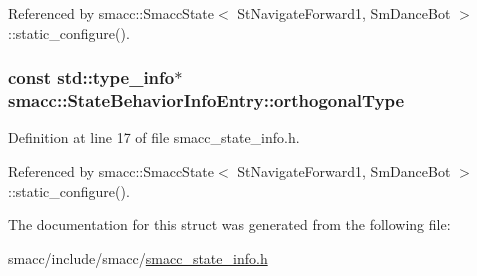 Referenced by smacc\+::\+Smacc\+State$<$ St\+Navigate\+Forward1, Sm\+Dance\+Bot $>$\+::static\+\_\+configure().

\subsubsection[{\texorpdfstring{orthogonal\+Type}{orthogonalType}}]{\setlength{\rightskip}{0pt plus 5cm}const std\+::type\+\_\+info$\ast$ smacc\+::\+State\+Behavior\+Info\+Entry\+::orthogonal\+Type}\hypertarget{structsmacc_1_1StateBehaviorInfoEntry_aefc43616f2bd059594b3b90d6ad47916}{}\label{structsmacc_1_1StateBehaviorInfoEntry_aefc43616f2bd059594b3b90d6ad47916}


Definition at line 17 of file smacc\+\_\+state\+\_\+info.\+h.



Referenced by smacc\+::\+Smacc\+State$<$ St\+Navigate\+Forward1, Sm\+Dance\+Bot $>$\+::static\+\_\+configure().



The documentation for this struct was generated from the following file\+:\begin{DoxyCompactItemize}
\item 
smacc/include/smacc/\hyperlink{smacc__state__info_8h}{smacc\+\_\+state\+\_\+info.\+h}\end{DoxyCompactItemize}
